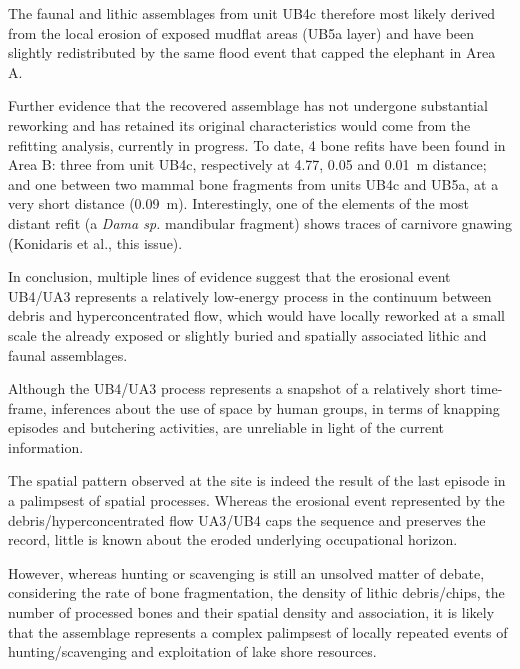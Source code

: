 \documentclass[preprint,authoryear,times]{elsarticle} %
\begin{document}
The faunal and lithic assemblages from unit UB4c therefore most likely derived from the local erosion of exposed mudflat areas (UB5a layer) and have been slightly redistributed by the same flood event that capped the elephant in Area A.

Further evidence that the recovered assemblage has not undergone substantial reworking and has retained its original characteristics would come from the refitting analysis, currently in progress. To date, 4 bone refits have been found in Area B: three from unit UB4c, respectively at 4.77, 0.05 and 0.01~m distance; and one between two mammal bone fragments from units UB4c and UB5a, at a very short distance (0.09~m). Interestingly, one of the elements of the most distant refit (a \emph{Dama sp.} mandibular fragment) shows traces of carnivore gnawing (Konidaris et al., this issue).

In conclusion, multiple lines of evidence suggest that the erosional event UB4/UA3 represents a relatively low-energy process in the continuum between debris and hyperconcentrated flow, which would have locally reworked at a small scale the already exposed or slightly buried and spatially associated lithic and faunal assemblages.

Although the UB4/UA3 process represents a snapshot of a relatively short time-frame, inferences about the use of space by human groups, in terms of knapping episodes and butchering activities, are unreliable in light of the current information.

The spatial pattern observed at the site is indeed the result of the last episode in a palimpsest of spatial processes. Whereas the erosional event represented by the debris/hyperconcentrated flow UA3/UB4 caps the sequence and preserves the record, little is known about the eroded underlying occupational horizon.

However, whereas hunting or scavenging is still an unsolved matter of debate, considering the rate of bone fragmentation, the density of lithic debris/chips, the number of processed bones and their spatial density and association, it is likely that the assemblage represents a complex palimpsest of locally repeated events of hunting/scavenging and exploitation of lake shore resources. %
\end{document}
